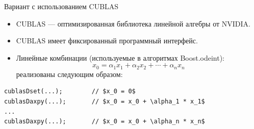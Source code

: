 \documentclass[@BEAMER_OPTIONS@]{beamer}
\begin{document}

\begin{frame}[fragile]{Вариант с использованием CUBLAS}
    \begin{itemize}
        \item CUBLAS --- оптимизированная библиотека линейной алгебры от
            NVIDIA.
        \item CUBLAS имеет фиксированный программный интерфейс.
        \item Линейные комбинации (используемые в алгоритмах Boost.odeint):
            \begin{equation*}
                x_0 = \alpha_1 x_1 + \alpha_2 x_2 + \cdots + \alpha_n x_n
            \end{equation*}
            реализованы следующим образом:
    \end{itemize}
    \begin{exampleblock}{}
        \begin{lstlisting}[numbers=none,texcl=true]
cublasDset(...);        // $x_0 = 0$
cublasDaxpy(...);       // $x_0 = x_0 + \alpha_1 * x_1$
...
cublasDaxpy(...);       // $x_0 = x_0 + \alpha_n * x_n$
        \end{lstlisting}
    \end{exampleblock}
\end{frame}

\note{ }
\end{document}
